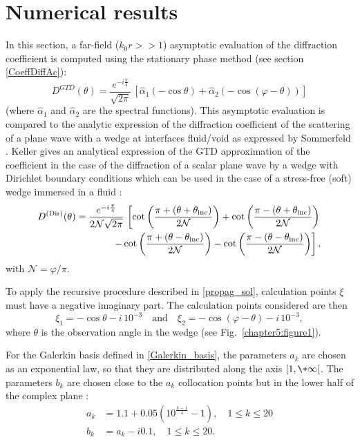 \section{Numerical results}
\label{Chapter5:results}

In this section, a far-field ($k_0r>>1$) asymptotic evaluation of the diffraction coefficient is computed using the stationary phase method (see section \ref{CoeffDiffAc}):
\begin{equation}
D^{GTD}(\theta) = \dfrac{e^{-i\frac{\pi}{4}}}{\sqrt{2\pi}} \, [\hat{\alpha}_1( - \cos \theta) + \hat{\alpha}_2( - \cos ( \varphi - \theta))]
\end{equation}
(where $\hat{\alpha}_1$ and $\hat{\alpha}_2$ are the spectral functions). This asymptotic evaluation is compared to the analytic expression of the diffraction coefficient of the scattering of a plane wave with a wedge at interfaces fluid/void as expressed by Sommerfeld \cite{Sommerfeld}. Keller \cite{GTD} gives an analytical expression of the GTD approximation of the coefficient in the case of the diffraction of a scalar plane wave by a wedge with Dirichlet boundary conditions which can be used in the case of a stress-free (soft) wedge immersed in a fluid :
\begin{align}
\label{GTDCoeff_Dir}
D^{\rm (Dir)}(\theta) = \dfrac{e^{-i\frac{\pi}{4}}}{2\mathcal{N} \sqrt{2\pi}}  \, \left[ \cot \left( \dfrac{\pi + (\theta + \theta_{\rm inc})}{2\mathcal{N}} \right) + \cot \left( \dfrac{\pi - (\theta + \theta_{\rm inc})}{2\mathcal{N}} \right) \right.   \nonumber \\
\left. - \cot \left( \dfrac{\pi + (\theta - \theta_{\rm inc})}{2\mathcal{N}} \right) - \cot \left( \dfrac{\pi - (\theta - \theta_{\rm inc})}{2\mathcal{N}} \right) \right],
\end{align}
with $\mathcal{N}=\varphi/\pi$.

To apply the recursive procedure described in \ref{propag_sol}, calculation points $\xi$ must have a negative imaginary part. The calculation points considered are then
\begin{equation}
\label{calculation_points_recursive}
\xi_1 = -\cos \theta -i\,10^{-3}  \quad \text{and} \quad \xi_2=- \cos (\varphi - \theta) - i\, 10^{-3} ,
\end{equation}
where $\theta$ is the observation angle in the wedge (see Fig.~\ref{chapter5:figure1}).

For the Galerkin basis defined in \eqref{Galerkin_basis}, the parameters $a_k$ are chosen as an exponential law, so that they are distributed along the axis $\lbrack 1,\+\infty\lbrack$. The parameters $b_k$ are chosen close to the $a_k$ collocation points but in the lower half of the complex plane :
\begin{equation}
\begin{split}
\label{bas_Gal}
a_k &= 1.1 + 0.05 \left( 10^{\frac{k -1}{4}} - 1 \right), \quad 1\leq k\leq 20 \\
b_k &= a_k  - i 0.1, \quad 1\leq k\leq 20 .
\end{split}
\end{equation}

